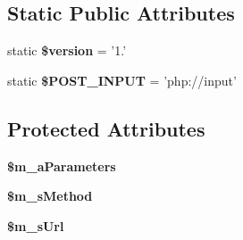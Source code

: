 \subsection*{Static Public Attributes}
\begin{DoxyCompactItemize}
\item 
\hypertarget{class_o_auth_request_a28c61e8084f468c69e9cf1efc5fa8292}{static {\bfseries \$version} = '1.'}\label{class_o_auth_request_a28c61e8084f468c69e9cf1efc5fa8292}

\item 
\hypertarget{class_o_auth_request_a19ca0f7fe7a6831f1260def5a5583b44}{static {\bfseries \$\-P\-O\-S\-T\-\_\-\-I\-N\-P\-U\-T} = 'php\-://input'}\label{class_o_auth_request_a19ca0f7fe7a6831f1260def5a5583b44}

\end{DoxyCompactItemize}
\subsection*{Protected Attributes}
\begin{DoxyCompactItemize}
\item 
\hypertarget{class_o_auth_request_a7f5cf2567240653afa5607fd083dd3ce}{{\bfseries \$m\-\_\-a\-Parameters}}\label{class_o_auth_request_a7f5cf2567240653afa5607fd083dd3ce}

\item 
\hypertarget{class_o_auth_request_ae016c94c93dc4d9601af70fbf2ebbd59}{{\bfseries \$m\-\_\-s\-Method}}\label{class_o_auth_request_ae016c94c93dc4d9601af70fbf2ebbd59}

\item 
\hypertarget{class_o_auth_request_a228561e84c95e5e45dac3a4ac4db5eac}{{\bfseries \$m\-\_\-s\-Url}}\label{class_o_auth_request_a228561e84c95e5e45dac3a4ac4db5eac}

\end{DoxyCompactItemize}


